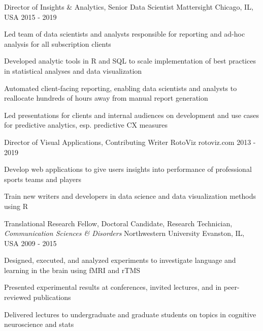 \begin{cventries}
 \cventry
    {Director of Insights \& Analytics, Senior Data Scientist} %
    {Mattersight} %
    {Chicago, IL, USA} %
    {2015 - 2019} %
    {
      \begin{cvitems}
        \item {Led team of data scientists and analysts responsible for reporting and ad-hoc analysis for all subscription clients}
        \item {Developed analytic tools in R and SQL to scale implementation of best practices in statistical analyses and data visualization}
        \item {Automated client-facing reporting, enabling data scientists and analysts to reallocate hundreds of hours away from manual report generation}
        \item {Led presentations for clients and internal audiences on development and use cases for predictive analytics, esp. predictive CX measures}
      \end{cvitems}
    }
    
 \cventry
    {Director of Visual Applications, Contributing Writer}
    {RotoViz}
    {rotoviz.com}
    {2013 - 2019}
    {
     \begin{cvitems}
       \item {Develop web applications to give users insights into performance of professional sports teams and players}
       \item {Train new writers and developers in data science and data visualization methods using R}
     \end{cvitems}
   }
   
 \cventry
    {Translational Research Fellow, Doctoral Candidate, Research Technician, \textit{Communication Sciences \& Disorders}} %
    {Northwestern University} %
    {Evanston, IL, USA} %
    {2009 - 2015} %
   {
    \begin{cvitems}
    \item {Designed, executed, and analyzed experiments to investigate language and learning in the brain using fMRI and rTMS}
    \item {Presented experimental results at conferences, invited lectures, and in peer-reviewed publications} 
    \item {Delivered lectures to undergraduate and graduate students on topics in cognitive neuroscience and stats} 
    \end{cvitems}
    }
    
\end{cventries}
